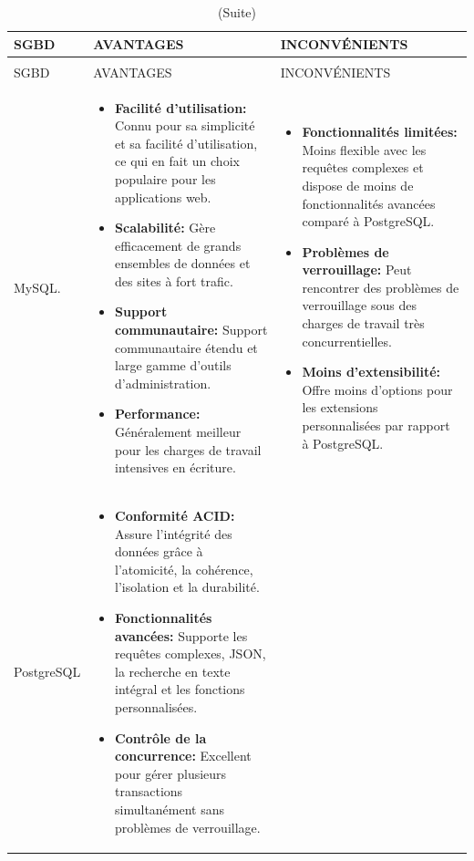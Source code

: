 \documentclass[12pt]{report}
\begin{document}
				\begin{longtable}{|p{3cm}|p{5.5cm}|p{5.5cm}|} 
						\caption{Comparaison entre MySQL, H2 et PostgreSQL.} 
						\label{tab:tableau 13}\\ 
						\hline 
						SGBD & AVANTAGES & INCONVÉNIENTS\\ 
						\hline 
						\endfirsthead 	
						\caption[]{(Suite)}\\ 
						\hline 
						SGBD & AVANTAGES & INCONVÉNIENTS\\ 
						\hline 
						\endhead
						MySQL. &
						\begin{itemize}
							\item \textbf{Facilité d'utilisation:} Connu pour sa simplicité et sa facilité d'utilisation, ce qui en fait un choix populaire pour les applications web.
							\item \textbf{Scalabilité:} Gère efficacement de grands ensembles de données et des sites à fort trafic.
							\item \textbf{Support communautaire:} Support communautaire étendu et large gamme d'outils d'administration.
							\item \textbf{Performance:}  Généralement meilleur pour les charges de travail intensives en écriture.
						\end{itemize}
						&
						\begin{itemize}
							\item \textbf{Fonctionnalités limitées:} Moins flexible avec les requêtes complexes et dispose de moins de fonctionnalités avancées comparé à PostgreSQL.
							\item \textbf{Problèmes de verrouillage:} Peut rencontrer des problèmes de verrouillage sous des charges de travail très concurrentielles.
							\item \textbf{Moins d'extensibilité:} Offre moins d'options pour les extensions personnalisées par rapport à PostgreSQL.
						\end{itemize}\\						
						\hline
						PostgreSQL &
						\begin{itemize}
							\item \textbf{Conformité ACID:} Assure l'intégrité des données grâce à l'atomicité, la cohérence, l'isolation et la durabilité.
							\item \textbf{Fonctionnalités avancées:} Supporte les requêtes complexes, JSON, la recherche en texte intégral et les fonctions personnalisées.
							\item \textbf{Contrôle de la concurrence:} Excellent pour gérer plusieurs transactions simultanément sans problèmes de verrouillage.

\end{itemize}
\end{longtable}
\end{document}
